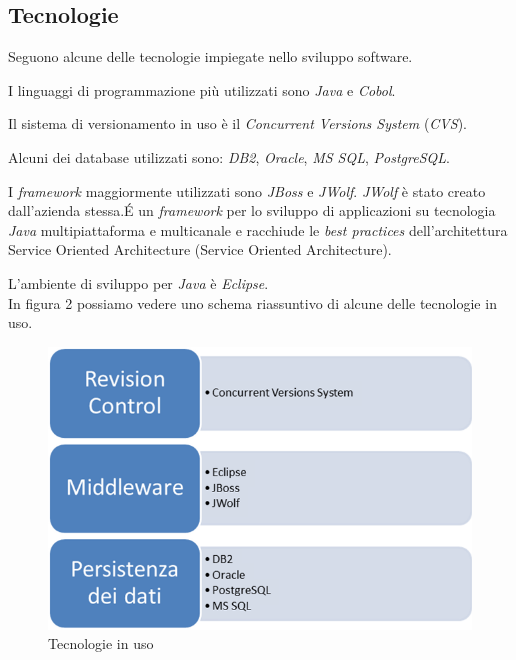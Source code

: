 \subsection{Tecnologie}
\label{1.3}
Seguono alcune delle tecnologie impiegate nello sviluppo software.

I linguaggi di programmazione più utilizzati sono \emph{Java} e \emph{Cobol}.

Il sistema di versionamento in uso è il \emph{Concurrent Versions System} (\emph{CVS}).

Alcuni dei database utilizzati sono: \emph{DB2}, \emph{Oracle}, \emph{MS SQL}, \emph{PostgreSQL}.

I \emph{framework} maggiormente utilizzati sono \emph{JBoss} e \emph{JWolf}. \emph{JWolf} è stato creato dall'azienda stessa.\'{E} un \emph{framework} per lo sviluppo di applicazioni su tecnologia \emph{Java} multipiattaforma e multicanale e racchiude le \emph{best practices} dell'architettura {Service Oriented Architecture} (\gls{Service Oriented Architecture}).

L'ambiente di sviluppo per \emph{Java} è \emph{Eclipse}.\\

In figura 2 possiamo vedere uno schema riassuntivo di alcune delle tecnologie in uso.
\begin{figure}[H]
\centering
\includegraphics[scale=0.55]{../Logo&Header/tecnologieUsate.png}
\caption{Tecnologie in uso}
\end{figure}


